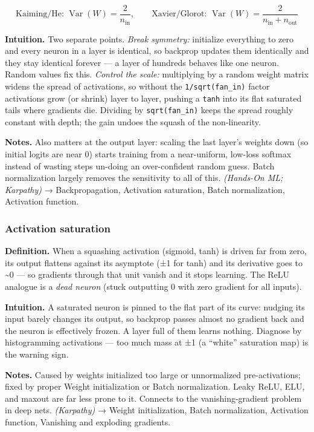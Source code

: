 \documentclass[
  10pt,
  letterpaper,
  onecolumn]{article}
\begin{document}
\begin{equation*}
\text{Kaiming/He: } \operatorname{Var}(W)=\frac{2}{n_{\text{in}}},
\qquad
\text{Xavier/Glorot: } \operatorname{Var}(W)=\frac{2}{n_{\text{in}}+n_{\text{out}}}
\end{equation*}

\textbf{Intuition.} Two separate points. \emph{Break symmetry:}
initialize everything to zero and every neuron in a layer is identical,
so backprop updates them identically and they stay identical forever ---
a layer of hundreds behaves like one neuron. Random values fix this.
\emph{Control the scale:} multiplying by a random weight matrix widens
the spread of activations, so without the \texttt{1/sqrt(fan\_in)}
factor activations grow (or shrink) layer to layer, pushing a
\texttt{tanh} into its flat saturated tails where gradients die.
Dividing by \texttt{sqrt(fan\_in)} keeps the spread roughly constant
with depth; the gain undoes the squash of the non-linearity.

\textbf{Notes.} Also matters at the output layer: scaling the last
layer's weights down (so initial logits are near 0) starts training from
a near-uniform, low-loss softmax instead of wasting steps un-doing an
over-confident random guess. Batch normalization largely removes the
sensitivity to all of this. \emph{(Hands-On ML; Karpathy)} →
Backpropagation, Activation saturation, Batch normalization, Activation
function.

\hypertarget{activation-saturation}{%
\subsubsection{Activation saturation}\label{activation-saturation}}

\textbf{Definition.} When a squashing activation (sigmoid, tanh) is
driven far from zero, its output flattens against its asymptote (±1 for
tanh) and its derivative goes to \textasciitilde0 --- so gradients
through that unit vanish and it stops learning. The ReLU analogue is a
\emph{dead neuron} (stuck outputting 0 with zero gradient for all
inputs).

\textbf{Intuition.} A saturated neuron is pinned to the flat part of its
curve: nudging its input barely changes its output, so backprop passes
almost no gradient back and the neuron is effectively frozen. A layer
full of them learns nothing. Diagnose by histogramming activations ---
too much mass at ±1 (a ``white'' saturation map) is the warning sign.

\textbf{Notes.} Caused by weights initialized too large or unnormalized
pre-activations; fixed by proper Weight initialization or Batch
normalization. Leaky ReLU, ELU, and maxout are far less prone to it.
Connects to the vanishing-gradient problem in deep nets.
\emph{(Karpathy)} → Weight initialization, Batch normalization,
Activation function, Vanishing and exploding gradients.
\end{document}
